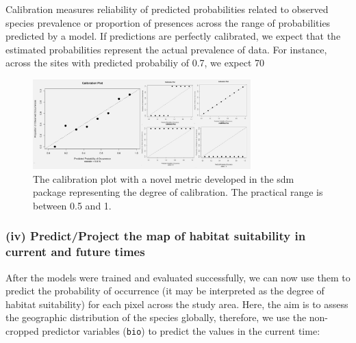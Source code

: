 \documentclass[
]{article}
\begin{document}
\begin{mdframed}[backgroundcolor=gray!10, linecolor=black!75, linewidth=2pt, roundcorner=5pt, shadow=true,frametitle={\textbf{BOX 2: \uline{Model evaluations for SDMs}}}]
Calibration measures reliability of predicted probabilities related to observed species prevalence or proportion of presences across the range of probabilities predicted by a model.  If predictions are perfectly calibrated, we expect that the estimated probabilities represent the actual prevalence of data. For instance, across the sites with predicted probabiliy of 0.7, we expect 70%

\begin{figure}[H]
    \centering
    \includegraphics[width=0.75\textwidth]{calibration.png}
    \caption{The calibration plot with a novel metric developed in the sdm package representing the degree of calibration. The practical range is between 0.5 and 1.}
    \label{fig:Fig5}
\end{figure}



\end{mdframed}

\subsubsection{(iv) Predict/Project the map of habitat suitability in
current and future
times}\label{iv-predictproject-the-map-of-habitat-suitability-in-current-and-future-times}

After the models were trained and evaluated successfully, we can now use
them to predict the probability of occurrence (it may be interpreted as
the degree of habitat suitability) for each pixel across the study area.
Here, the aim is to assess the geographic distribution of the species
globally, therefore, we use the non-cropped predictor variables
(\texttt{bio}) to predict the values in the current time:
\end{document}
